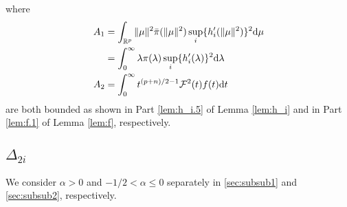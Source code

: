 \documentclass[preprint,11pt]{imsart}
\numberwithin{equation}{section}
\theoremstyle{plain}
\theoremstyle{definition}
\theoremstyle{remark}
\newcommand{\rd}{\mathrm{d}}
\begin{document}
where
\begin{align}
 A_1&=\int_{\mathbb{R}^p} \|\mu\|^2\bar{\pi}(\|\mu\|^2)\sup_i \{h'_i(\|\mu\|^2)\}^2 \rd \mu \notag\\
 &=\int_0^\infty\lambda \pi(\lambda)\sup_i \{h'_i(\lambda)\}^2 \rd \lambda \label{proof.A_1} \\
 A_2&=\int_0^\infty t^{(p+n)/2-1} \mathcal{F}^2(t) f(t)  \rd t    \label{proof.A_2}
\end{align}
are both bounded as shown in Part \ref{lem:h_i.5} of Lemma \ref{lem:h_i} and in
Part \ref{lem:f.1} of Lemma \ref{lem:f}, respectively. 

\subsection{$\Delta_{2i}$}
\label{sec:del23}
We consider $\alpha>0$ and $-1/2<\alpha\leq 0$ separately in \ref{sec:subsub1}
and \ref{sec:subsub2}, respectively.
\end{document}
